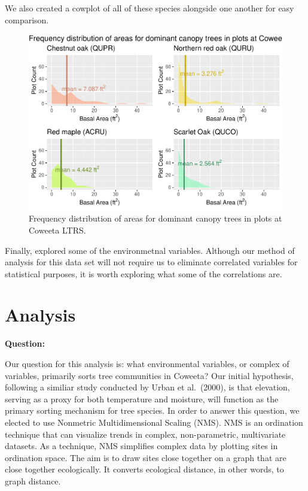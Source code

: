 \documentclass[
  12pt,
]{article}
\begin{document}
We also created a cowplot of all of these species alongside one another
for easy comparison.

\begin{figure}
\centering
\includegraphics{ProjectDraft_files/figure-latex/unnamed-chunk-5-1.pdf}
\caption{Frequency distribution of areas for dominant canopy trees in
plots at Coweeta LTRS.}
\end{figure}

Finally, explored some of the environmetnal variables. Although our
method of analysis for this data set will not require us to eliminate
correlated variables for statistical purposes, it is worth exploring
what some of the correlations are.

\newpage

\hypertarget{analysis}{%
\section{Analysis}\label{analysis}}

\textbf{Question:}

Our question for this analysis is: what environmental variables, or
complex of variables, primarily sorts tree communities in Coweeta? Our
initial hypothesis, following a similiar study conducted by Urban et
al.~(2000), is that elevation, serving as a proxy for both temperature
and moisture, will function as the primary sorting mechanism for tree
species. In order to answer this question, we elected to use Nonmetric
Multidimensional Scaling (NMS). NMS is an ordination technique that can
visualize trends in complex, non-parametric, multivariate datasets. As a
technique, NMS simplifies complex data by plotting sites in ordination
space. The aim is to draw sites close together on a graph that are close
together ecologically. It converts ecological distance, in other words,
to graph distance.
\end{document}
